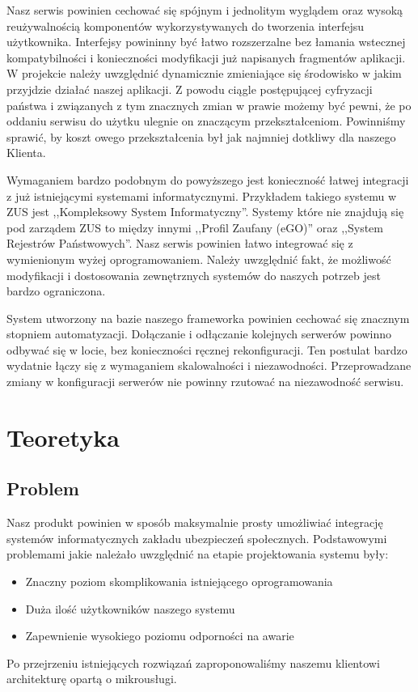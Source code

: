 \documentclass[licencjacka]{pracamgr}
\begin{document}
Nasz serwis powinien cechować się spójnym i jednolitym wyglądem oraz wysoką
reużywalnością komponentów wykorzystywanych do tworzenia interfejsu użytkownika.
Interfejsy powininny być łatwo rozszerzalne bez łamania wstecznej kompatybilności
i konieczności modyfikacji już napisanych fragmentów aplikacji. W projekcie
należy uwzględnić dynamicznie zmieniające się środowisko w jakim przyjdzie działać
naszej aplikacji. Z powodu ciągle postępującej cyfryzacji państwa i związanych z
tym znacznych zmian w prawie możemy być pewni, że po oddaniu serwisu do użytku
ulegnie on znaczącym przekształceniom. Powinniśmy sprawić, by koszt owego przekształcenia
był jak najmniej dotkliwy dla naszego Klienta.

Wymaganiem bardzo podobnym do powyższego jest konieczność łatwej integracji z już
istniejącymi systemami informatycznymi. Przykładem takiego systemu w ZUS jest
,,Kompleksowy System Informatyczny''. Systemy które nie znajdują się pod zarządem ZUS
to między innymi ,,Profil Zaufany (eGO)'' oraz ,,System Rejestrów Państwowych''.
Nasz serwis powinien łatwo integrować się z wymienionym wyżej oprogramowaniem.
Należy uwzględnić fakt, że możliwość modyfikacji i dostosowania zewnętrznych
systemów do naszych potrzeb jest bardzo ograniczona.

System utworzony na bazie naszego frameworka powinien cechować się znacznym stopniem
automatyzacji. Dołączanie i odłączanie kolejnych serwerów powinno odbywać się w locie,
bez konieczności ręcznej rekonfiguracji. Ten postulat bardzo wydatnie łączy się z
wymaganiem skalowalności i niezawodności. Przeprowadzane zmiany w konfiguracji serwerów
nie powinny rzutować na niezawodność serwisu.

\chapter{Teoretyka}

\section{Problem}

Nasz produkt powinien w sposób maksymalnie prosty umożliwiać integrację systemów
informatycznych zakładu ubezpieczeń społecznych. Podstawowymi problemami jakie
należało uwzględnić na etapie projektowania systemu były:
\begin{itemize}
	\item Znaczny poziom skomplikowania istniejącego oprogramowania
	\item Duża ilość użytkowników naszego systemu
	\item Zapewnienie wysokiego poziomu odporności na awarie
\end{itemize}
Po przejrzeniu istniejących rozwiązań zaproponowaliśmy naszemu klientowi
architekturę opartą o mikrousługi.
\end{document}
